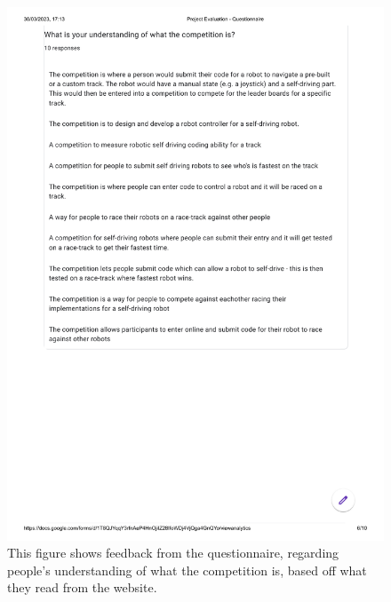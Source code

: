 \documentclass{l4proj}
\begin{document}
\begin{appendices}
\begin{figure}
    \centering
    \includegraphics[width=1\textwidth]{images/website-questions.pdf}
    \caption{This figure shows feedback from the questionnaire, regarding people's understanding of what the competition is, based off what they read from the website.}
    \label{fig:feedback-1}
\end{figure}


\end{appendices}
\end{document}
